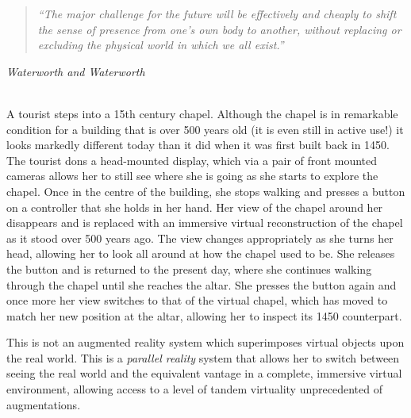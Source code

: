 \begin{quote}
	\textit{``The major challenge for the future will be effectively and cheaply to shift the sense of presence from one's own body to another, without replacing or excluding the physical world in which we all exist.''}
\end{quote}
\hfill \textit{Waterworth and Waterworth}~\cite{Waterworth2014}
\\
\\

\label{introduction}


A tourist steps into a 15th century chapel. Although the chapel is in remarkable condition for a building that is over 500 years old (it is even still in active use!) it looks markedly different today than it did when it was first built back in 1450. The tourist dons a head-mounted display, which via a pair of front mounted cameras allows her to still see where she is going as she starts to explore the chapel. Once in the centre of the building, she stops walking and presses a button on a controller that she holds in her hand. Her view of the chapel around her disappears and is replaced with an immersive virtual reconstruction of the chapel as it stood over 500 years ago. The view changes appropriately as she turns her head, allowing her to look all around at how the chapel used to be. She releases the button and is returned to the present day, where she continues walking through the chapel until she reaches the altar. She presses the button again and once more her view switches to that of the virtual chapel, which has moved to match her new position at the altar, allowing her to inspect its 1450 counterpart.

This is not an augmented reality system which superimposes virtual objects upon the real world. This is a \textit{parallel reality} system that allows her to switch between seeing the real world and the equivalent vantage in a complete, immersive virtual environment, allowing access to a level of tandem virtuality unprecedented of augmentations.


